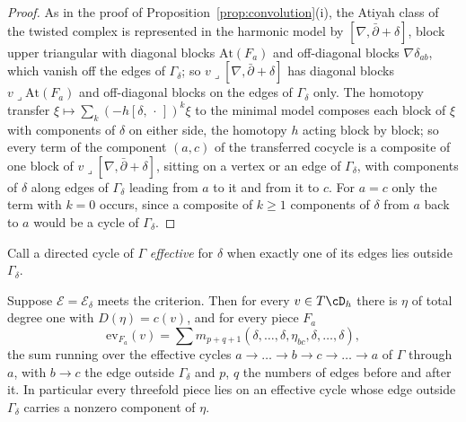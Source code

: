 \begin{proof}
As in the proof of Proposition~\ref{prop:convolution}(i), the Atiyah class of the twisted complex is represented in the harmonic model by $[\nabla,\bar\partial+\delta]$, block upper triangular with diagonal blocks $\mathrm{At}(F_{a})$ and off-diagonal blocks $\nabla\delta_{ab}$, which vanish off the edges of $\Gamma_{\delta}$; so $v\lrcorner[\nabla,\bar\partial+\delta]$ has diagonal blocks $v\lrcorner\mathrm{At}(F_{a})$ and off-diagonal blocks on the edges of $\Gamma_{\delta}$ only. The homotopy transfer $\xi\mapsto\sum_{k}(-h[\delta,\,\cdot\,])^{k}\xi$ to the minimal model composes each block of $\xi$ with components of $\delta$ on either side, the homotopy $h$ acting block by block; so every term of the component $(a,c)$ of the transferred cocycle is a composite of one block of $v\lrcorner[\nabla,\bar\partial+\delta]$, sitting on a vertex or an edge of $\Gamma_{\delta}$, with components of $\delta$ along edges of $\Gamma_{\delta}$ leading from $a$ to it and from it to $c$. For $a=c$ only the term with $k=0$ occurs, since a composite of $k\ge1$ components of $\delta$ from $a$ back to $a$ would be a cycle of $\Gamma_{\delta}$.
\end{proof}

Call a directed cycle of $\Gamma$ \emph{effective} for $\delta$ when exactly one of its edges lies outside $\Gamma_{\delta}$.

\begin{proposition}\label{prop:effective}
Suppose $\mathcal{E}=\mathcal{E}_{\delta}$ meets the criterion. Then for every $v\in T\cD_{h}$ there is $\eta$ of total degree one with $D(\eta)=c(v)$, and for every piece $F_{a}$
\[
\mathrm{ev}_{F_{a}}(v)=\sum m_{p+q+1}(\delta,\dots,\delta,\eta_{bc},\delta,\dots,\delta),
\]
the sum running over the effective cycles $a\to\dots\to b\to c\to\dots\to a$ of $\Gamma$ through $a$, with $b\to c$ the edge outside $\Gamma_{\delta}$ and $p$, $q$ the numbers of edges before and after it. In particular every threefold piece lies on an effective cycle whose edge outside $\Gamma_{\delta}$ carries a nonzero component of $\eta$.
\end{proposition}

